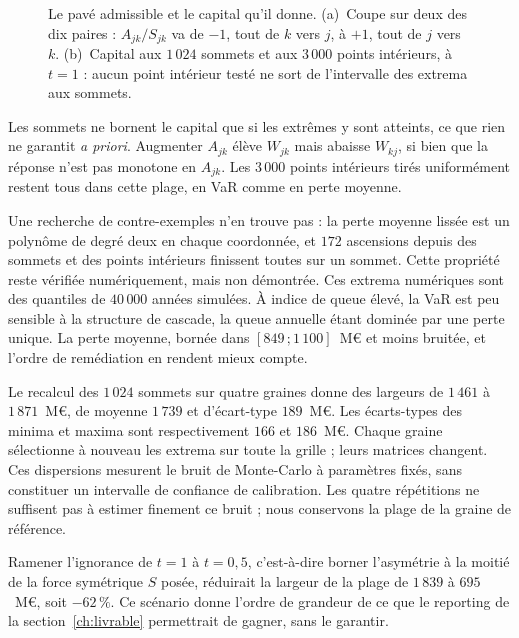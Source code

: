 \begin{figure}[H]
  \centering
  \caption{Le pavé admissible et le capital qu'il donne. (a)~Coupe sur deux des dix paires :
$A_{jk}/S_{jk}$ va de $-1$, tout de $k$ vers $j$, à $+1$, tout de $j$ vers $k$. (b)~Capital aux
$1\,024$ sommets et aux $3\,000$ points intérieurs, à $t = 1$ : aucun point intérieur testé ne sort
de l'intervalle des extrema aux sommets.}
  \label{fig:pave-sommets}
\end{figure}

Les sommets ne bornent le capital que si les extrêmes y sont atteints, ce que rien ne garantit
\emph{a priori}. Augmenter $A_{jk}$ élève $W_{jk}$ mais abaisse $W_{kj}$, si bien que la
réponse n'est pas monotone en $A_{jk}$. Les $3\,000$ points intérieurs tirés uniformément restent tous
dans cette plage, en VaR comme en perte moyenne.

Une recherche de contre-exemples n'en trouve pas : la
perte moyenne lissée est un polynôme de degré deux en chaque coordonnée, et $172$ ascensions depuis des
sommets et des points intérieurs finissent toutes sur un sommet. Cette propriété reste vérifiée
numériquement, mais non démontrée. Ces extrema numériques sont des quantiles de $40\,000$ années simulées. À indice de queue élevé, la VaR est peu sensible à la structure de
cascade, la queue annuelle étant dominée par une perte unique. La perte moyenne, bornée
dans $[849\,;1\,100]$~M\euro{} et moins bruitée, et l'ordre de remédiation en rendent mieux compte.

Le recalcul des $1\,024$ sommets sur quatre graines donne des largeurs de $1\,461$ à
$1\,871$~M\euro{}, de moyenne $1\,739$ et d'écart-type $189$~M\euro{}. Les écarts-types des
minima et maxima sont respectivement $166$ et $186$~M\euro{}. Chaque graine sélectionne à nouveau
les extrema sur toute la grille ; leurs matrices changent. Ces dispersions mesurent le bruit de
Monte-Carlo à paramètres fixés, sans constituer un intervalle de confiance de calibration. Les
quatre répétitions ne suffisent pas à estimer finement ce bruit ; nous conservons la plage de la graine de référence.

Ramener l'ignorance de $t=1$ à $t=0{,}5$, c'est-à-dire borner l'asymétrie à la moitié de la
force symétrique $S$ posée, réduirait la largeur de la plage de $1\,839$ à $695$~M\euro{}, soit $-62\,\%$. Ce scénario donne l'ordre de grandeur de ce que le reporting de la section~\ref{ch:livrable} permettrait de gagner, sans le garantir.

